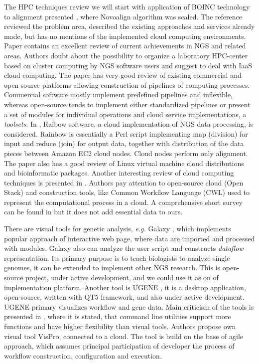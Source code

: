 \documentclass[a4paper]{jpconf}
\begin{document}
The HPC techniques review we will start with application of BOINC technology to alignment presented \cite{boinc10}, where Novoalign algorithm was scaled.
The reference \cite{guo16} reviewed the problem area, described the existing approaches and services already made, but has no mentions of the implemented cloud computing environments.
Paper \cite{kwon15} contains an excellent review of current achievements in NGS and  related areas. Authors doubt about the possibility to organize a laboratory HPC-center based on cluster computing by NGS software users and suggest to deal with IaaS cloud computing. The paper has very good review of existing commercial and open-source platforms allowing construction of pipelines of computing processes. Commercial software mostly implement predefined pipelines and inflexible, whereas open-source tends to implement either standardized pipelines or present a set of modules for individual operations and cloud service implementations, a \emph{toolsets}.
In \cite{zhao17}, Raibow software, a cloud implementation of NGS data processing, is considered. Rainbow is essentially a Perl script implementing map (division) for input and reduce (join) for output data, together with distribution of the data pieces between Amazon EC2 cloud nodes. Cloud nodes perform only alignment. The paper also has a good review of Linux virtual machine cloud distributions and bioinformatic packages.
Another interesting review of cloud computing techniques is presented in \cite{lang18}. Authors pay attention to open-source cloud (Open Stack) and construction tools, like Common Workflow Language (CWL) \cite{cwl} used to represent the computational process in a cloud.
A comprehensive short survey can be found in \cite{baker18} but it does not add essential data to ours.

There are visual tools for genetic analysis, \emph{e.g.} Galaxy \cite{galaxy18}, which implements popular approach of interactive web page, where data are imported and processed with modules. Galaxy also can analyze the user script and constructs \emph{dataflow} representation. Its primary purpose is to teach biologists to analyze single genomes, it can be extended to implement other NGS research. This is open-source project, under active development, and we could use it as on of implementation platform. Another tool is UGENE \cite{ugene18}, it is a desktop application, open-source, written with QT5 framework, and also under active development. UGENE primary visualizes workflow and gene data. Main criticism of the tools is presented in \cite{mill16}, where it is stated, that command line utilities support more functions and have higher flexibility than visual tools. Authors propose own visual tool VisPro, connected to a cloud. The tool is build on the base of agile approach, which assumes principal participation of developer the process of workflow construction, configuration and execution.
\end{document}
